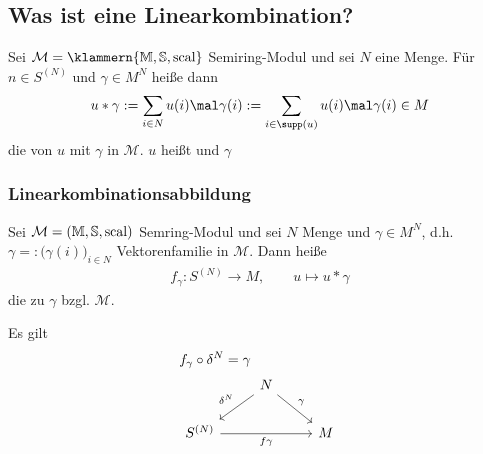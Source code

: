 \subsection{Was ist eine Linearkombination?}
Sei $\mathcal{M}=\klammern{\M,\S,\scal}$ Semiring-Modul und sei $N$ eine Menge.
Für $n\in S^{(N)}$ und $\gamma\in M^N$ heiße dann
\begin{align*}
	u*\gamma:=\sum\limits_{i\in N} u(i)\mal\gamma(i):=\sum\limits_{i\in\supp(u)} u(i)\mal\gamma(i)\in M
\end{align*}
die  von $u$ mit $\gamma$ in $\mathcal{M}$.
$u$ heißt  und $\gamma$ 

\subsubsection{Linearkombinationsabbildung}
Sei $\mathcal{M}=(\mathbb{M},\mathbb{S},\operatorname{scal})$ Semring-Modul und sei $N$ Menge und $\gamma\in M^N$, d.h. $\gamma=:\big(\gamma(i)\big)_{i\in N}$ Vektorenfamilie in $\mathcal{M}$.
Dann heiße
\begin{align*}
	f_\gamma\colon S^{(N)}\to M,\qquad
	u\mapsto u*\gamma
\end{align*}
die  zu $\gamma$ bzgl. $\mathcal{M}$.

\begin{satz}
	Es gilt
	\begin{align*}
		&f_\gamma\circ\delta^N=\gamma\\
		&\begin{tikzcd}[ampersand replacement=\&]
                               \& N \arrow[rd, "\gamma"] \arrow[ld, "\delta^N"'] \&   \\
S^{(N)} \arrow[rr, "f\gamma"'] \&                                                \& M
\end{tikzcd}
	\end{align*}
\end{satz}

